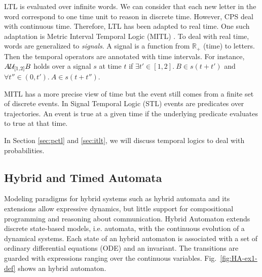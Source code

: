 \documentclass[
graybox,
envcountchap
]{svmult}
\begin{document}
\begin{bibunit}


LTL is evaluated over infinite words.
We can consider that each new letter in the word correspond to one time unit to reason in discrete time.
However, CPS deal with continuous time.
Therefore, LTL has been adapted to real time.
One such adaptation is Metric Interval Temporal Logic (MITL) \cite{DBLP:journals/jacm/AlurFH96}.
%
To deal with real time, words are generalized to \emph{signals}.
A signal is a function from $\mathbb{R}_+$ (time) to letters.
Then the temporal operators are annotated with time intervals.
For instance, $A {\cal U}_{[1,2]} B$ holds over a signal $s$ at time $t$ if $\exists t' \in [1,2].~ B \in s(t+t')$ and $\forall t'' \in (0,t').~ A \in s(t+t'')$.

MITL has a more precise view of time but the event still comes from a finite set of discrete events.
In Signal Temporal Logic (STL) \cite{DBLP:conf/formats/MalerN04} events are predicates over trajectories.
An event is true at a given time if the underlying predicate evaluates to true at that time.


In Section \ref{sec:pctl} and \ref{sec:itlt}, we will discuss temporal logics to deal with probabilities.


\subsection{Hybrid and Timed Automata}

Modeling paradigms for hybrid systems such as hybrid automata and its extensions \cite{DBLP:conf/lics/Henzinger96,AlurGLS06,DBLP:journals/iandc/LynchSV03} allow expressive dynamics, but little support for compositional programming and reasoning about communication.
Hybrid Automaton extends discrete state-based models, i.e. automata, with the continuous evolution of a dynamical systems.
Each state of an hybrid automaton is associated with a set of ordinary differential equations (ODE) and an invariant.
The transitions are guarded with expressions ranging over the continuous variables.
Fig.~\ref{fig:HA-ex1-def} shows an hybrid automaton.


\end{bibunit}
\end{document}
